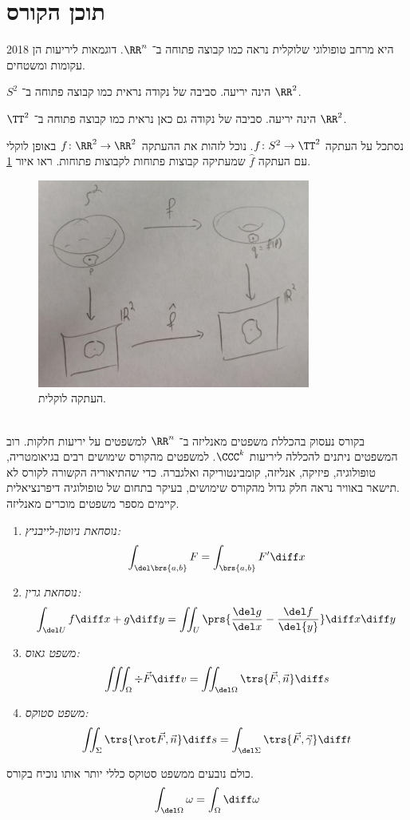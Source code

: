 \documentclass[a4paper,10pt,twoside,openany]{book}
\begin{document}
\section{תוכן הקורס}
{2018}
היא מרחב טופולוגי שלוקלית נראה כמו קבוצה פתוחה ב־%
$\RR^n$.%
דוגמאות ליריעות הן עקומות ומשטחים.
\begin{example}
$S^2$
הינה יריעה. סביבה של נקודה נראית כמו קבוצה פתוחה ב־%
$\RR^2$.
\end{example}
\begin{example}
$\TT^2$
הינה יריעה. סביבה של נקודה גם כאן נראית כמו קבוצה פתוחה ב־%
$\RR^2$.
\end{example}
נסתכל על העתקה
$f \colon S^2 \to \TT^2$.
נוכל לזהות את ההעתקה
$f \colon \RR^2 \to \RR^2$
באופן לוקלי עם העתקה
$\hat{f}$
שמעתיקה קבוצות פתוחות לקבוצות פתוחות. ראו איור
\ref{fig1}.
\begin{figure}[ht]
\centering
\caption{העתקה לוקלית.}
\label{fig1}
\includegraphics[width=0.8\textwidth]{sources/figure1}
\end{figure}
\\
בקורס נעסוק בהכללת משפטים מאנליזה ב־%
$\RR^n$
למשפטים על יריעות חלקות.
רוב המשפטים ניתנים להכללה ליריעות $\CCC^k$.
למשפטים מהקורס שימושים רבים בגיאומטריה, טופולוגיה, פיזיקה, אנליזה, קומבינטוריקה ואלגברה. כדי שהתיאוריה הקשורה לקורס לא תישאר באוויר נראה חלק גדול מהקורס שימושים, בעיקר בתחום של טופולוגיה דיפרנציאלית.
\\
קיימים מספר משפטים מוכרים מאנליזה.
\\
\begin{examples}
\begin{enumerate}
\item \emph{נוסחאת ניוטון-לייבניץ:}
\[\int_{\del\brs{a,b}} F = \int_{\brs{a,b}} F' \diff x\]
\item \emph{נוסחאת גרין:}
\[\int_{\del U} f\diff x + g \diff y = \iint_{U} \prs{\frac{\del g}{\del x} - \frac{\del f}{\del{y}}} \diff x \diff y\]
\item \emph{משפט גאוס:}
\[\iiint_{\Omega} \div \vec{F} \diff v = \iint_{\del \Omega} \trs{\vec{F},\vec{n}} \diff s\]
\item \emph{משפט סטוקס:}
\[\iint_{\Sigma} \trs{\rot \vec{F}, \vec{n}} \diff s = \int_{\del \Sigma} \trs{\vec{F}, \vec{\gamma}} \diff t\]
\end{enumerate}
\end{examples}
כולם נובעים ממשפט סטוקס כללי יותר אותו נוכיח בקורס.
\[\int_{\del \Omega} \omega = \int_{\Omega} \diff \omega\]
\end{document}
